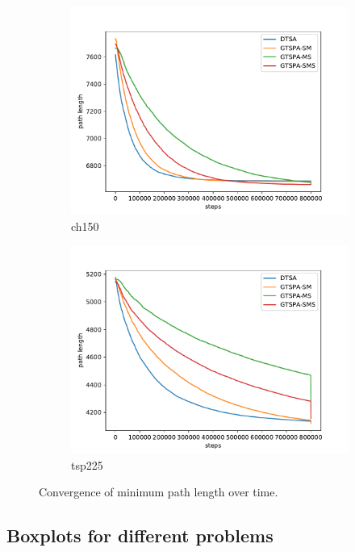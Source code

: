 \documentclass[12pt]{article}
\theoremstyle{plain}
\theoremstyle{definition}
\theoremstyle{remark}
\begin{document}
\begin{figure}[h]
\begin{subfigure}{.5\textwidth}
		\includegraphics[width=\textwidth]{../../Implementation/gen/mean_convergence_ch150}
		\caption{ch150}
	\end{subfigure}%
	\begin{subfigure}{.5\textwidth}
		\centering
		\includegraphics[width=\textwidth]{../../Implementation/gen/mean_convergence_tsp225}
		\caption{tsp225}
	\end{subfigure}
	\caption{Convergence of minimum path length over time.}
	\label{fig:mean_convergence}
\end{figure}

\newpage

\subsection{Boxplots for different problems}
\label{sec:boxplots_for_different_problems}
\end{document}
